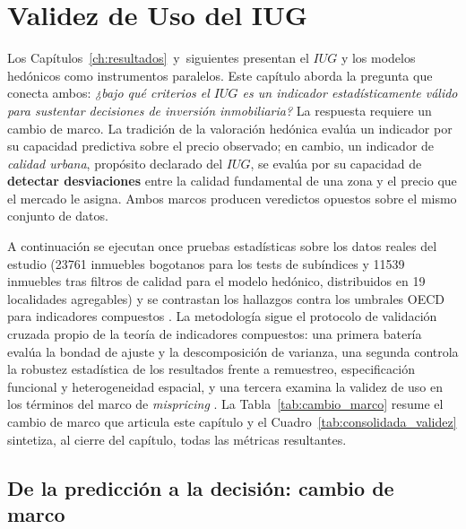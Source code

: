 \documentclass[12pt, a4paper, twoside, openright]{report}
\theoremstyle{plain}
\theoremstyle{definition}
\newcommand{\IUG}{IUG}             %
\begin{document}

\chapter{Validez de Uso del IUG}\label{ch:validez_uso}

Los Capítulos~\ref{ch:resultados}~y~siguientes presentan el $\IUG$ y los modelos hedónicos como instrumentos paralelos. Este capítulo aborda la pregunta que conecta ambos: \emph{¿bajo qué criterios el $\IUG$ es un indicador estadísticamente válido para sustentar decisiones de inversión inmobiliaria?} La respuesta requiere un cambio de marco. La tradición de la valoración hedónica evalúa un indicador por su capacidad predictiva sobre el precio observado; en cambio, un indicador de \emph{calidad urbana}, propósito declarado del $\IUG$, se evalúa por su capacidad de \textbf{detectar desviaciones} entre la calidad fundamental de una zona y el precio que el mercado le asigna. Ambos marcos producen veredictos opuestos sobre el mismo conjunto de datos.

A continuación se ejecutan once pruebas estadísticas sobre los datos reales del estudio (\num{23761} inmuebles bogotanos para los tests de subíndices y \num{11539} inmuebles tras filtros de calidad para el modelo hedónico, distribuidos en \num{19} localidades agregables) y se contrastan los hallazgos contra los umbrales OECD para indicadores compuestos \citep{nardo2008}. La metodología sigue el protocolo de validación cruzada propio de la teoría de indicadores compuestos: una primera batería evalúa la bondad de ajuste y la descomposición de varianza, una segunda controla la robustez estadística de los resultados frente a remuestreo, especificación funcional y heterogeneidad espacial, y una tercera examina la validez de uso en los términos del marco de \emph{mispricing} \citep{shiller2015}. La Tabla~\ref{tab:cambio_marco} resume el cambio de marco que articula este capítulo y el Cuadro~\ref{tab:consolidada_validez} sintetiza, al cierre del capítulo, todas las métricas resultantes.

\section{De la predicción a la decisión: cambio de marco}\label{sec:cambio_marco}
\end{document}
